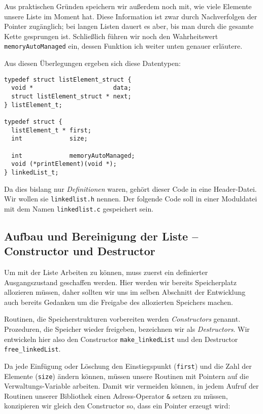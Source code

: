 Aus praktischen Gründen speichern wir außerdem noch mit, wie viele Elemente unsere Liste im Moment hat. Diese Information ist zwar durch Nachverfolgen der Pointer zugänglich; bei langen Listen dauert es aber, bis man durch die gesamte Kette gesprungen ist. Schließlich führen wir noch den Wahrheitswert \texttt{memoryAutoManaged} ein, dessen Funktion ich weiter unten genauer erläutere.

Aus diesen Überlegungen ergeben sich diese Datentypen:
\begin{codebox}
\begin{verbatim}
typedef struct listElement_struct {
  void *                      data;
  struct listElement_struct * next;
} listElement_t;

typedef struct {
  listElement_t * first;
  int             size;
  
  int             memoryAutoManaged;
  void (*printElement)(void *);
} linkedList_t;
\end{verbatim}
\end{codebox}

Da dies bislang nur \emph{Definitionen} waren, gehört dieser Code in eine Header-Datei. Wir wollen sie \texttt{linkedlist.h} nennen. Der folgende Code soll in einer Moduldatei mit dem Namen \texttt{linkedlist.c} gespeichert sein.

\subsection{Aufbau und Bereinigung der Liste -- Constructor und Destructor}
Um mit der Liste Arbeiten zu können, muss zuerst ein definierter Ausgangszustand geschaffen werden. Hier werden wir bereits Speicherplatz allozieren müssen, daher sollten wir uns im selben Abschnitt der Entwicklung auch bereits Gedanken um die Freigabe des allozierten Speichers machen.

Routinen, die Speicherstrukturen vorbereiten werden \emph{Constructors} genannt. Prozeduren, die Speicher wieder freigeben, bezeichnen wir als \emph{Destructors}. Wir entwickeln hier also den Constructor \texttt{make\_linkedList} und den Destructor \texttt{free\_linkedList}.

Da jede Einfügung oder Löschung den Einstiegspunkt (\texttt{first}) und die Zahl der Elemente (\texttt{size}) ändern können, müssen unsere Routinen mit Pointern auf die Verwaltungs-Variable arbeiten. Damit wir vermeiden können, in jedem Aufruf der Routinen unserer Bibliothek einen Adress-Operator \texttt{\&} setzen zu müssen, konzipieren wir gleich den Constructor so, dass ein Pointer erzeugt wird:


